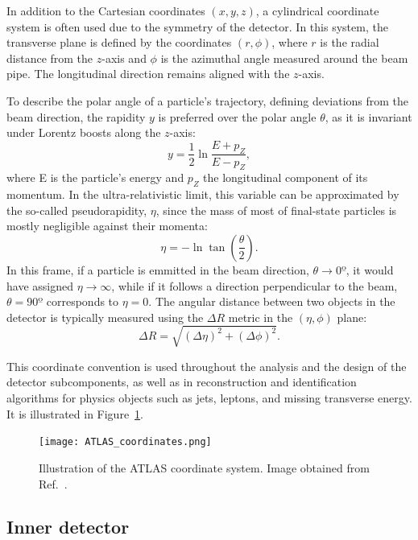 In addition to the Cartesian coordinates $(x, y, z)$, a cylindrical coordinate system is often used due to the symmetry of the detector. In this system, the transverse plane is defined by the coordinates $(r, \phi)$, where $r$ is the radial distance from the $z$-axis and $\phi$ is the azimuthal angle measured around the beam pipe. The longitudinal direction remains aligned with the $z$-axis.

To describe the polar angle of a particle’s trajectory, defining deviations from the beam direction, the rapidity $y$ is preferred over the polar angle $\theta$, as it is invariant under Lorentz boosts along the $z$-axis:
\begin{equation}
    y = \frac{1}{2}\ln{\frac{E+p_{Z}}{E-{p_{Z}}}},
\end{equation}
where E is the particle's energy and $p_{Z}$ the longitudinal component of its momentum. In the ultra-relativistic limit, this variable can be approximated by the so-called pseudorapidity, $\eta$, since the mass of most of final-state particles is mostly negligible against their momenta:
\begin{equation}
\eta = -\ln \tan \left( \frac{\theta}{2} \right).
\end{equation}
In this frame, if a particle is emmitted in the beam direction, $\theta \rightarrow 0º$, it would have assigned $\eta \rightarrow \infty$, while if it follows a direction perpendicular to the beam, $\theta = 90º$ corresponds to $\eta = 0$.
The angular distance between two objects in the detector is typically measured using the $\Delta R$ metric in the $(\eta, \phi)$ plane:
\begin{equation}
\Delta R = \sqrt{(\Delta \eta)^2 + (\Delta \phi)^2}.
\end{equation}

This coordinate convention is used throughout the analysis and the design of the detector subcomponents, as well as in reconstruction and identification algorithms for physics objects such as jets, leptons, and missing transverse energy. It is illustrated in Figure~\ref{fig:coord}.
\begin{figure}[htbp]
    \centering
        \texttt{[image: ATLAS\_coordinates.png]}
    \caption{Illustration of the ATLAS coordinate system. Image obtained from Ref.~\cite{coordinates}.}
    \label{fig:coord}
\end{figure}

\subsection{Inner detector}
\label{sec:ID}



